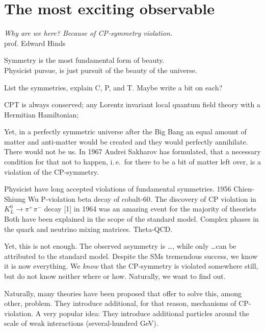 \chapter{The most exciting observable}
\label{ch:nedm-at-psi}

\begin{center}
  \emph{Why are we here? Because of CP-symmetry violation.}\\
  prof. Edward Hinds
\end{center}

Symmetry is the most fundamental form of beauty.\\Physicist pursue, is just pursuit of the beauty of the universe.

List the symmetries, explain C, P, and T. Maybe write a bit on each?

CPT is always conserved; any Lorentz invariant local quantum field theory with a Hermitian Hamiltonian; 

Yet, in a perfectly symmetric universe after the Big Bang an equal amount of matter and anti-matter would be created and they would perfectly annihilate. There would not be us.
In 1967 Andrei Sakharov
has formulated, that a necessary condition for that not to happen, i.\,e.\ for there to be a bit of matter left over, is a violation of the CP-symmetry.

Physicist have long accepted violations of fundamental symmetries.
1956 Chien-Shiung Wu P-violation beta decay of cobalt-60. 
The discovery of CP violation in $K^0_L \rightarrow \pi^+ \pi^-$ decay [1] in 1964 was an amazing event for the majority of theorists
Both have been explained in the scope of the standard model. Complex phases in the quark and neutrino mixing matrices. Theta-QCD.

Yet, this is not enough. \cite{Pospelov2005} The observed asymmetry is \ldots, while only \ldots can be attributed to the standard model. Despite the SMs tremendous success, we know it is now everything. We \emph{know} that the CP-symmetry is violated somewhere still, but do not know neither where or how. Naturally, we want to find out.

Naturally, many theories have been proposed that offer to solve this, among other, problem. They introduce additional, for that reason, mechanisms of CP-violation. A very popular idea: They introduce additional particles around the scale of weak interactions (several-hundred GeV).

